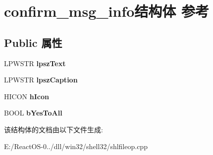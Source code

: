 \hypertarget{structconfirm__msg__info}{}\section{confirm\+\_\+msg\+\_\+info结构体 参考}
\label{structconfirm__msg__info}
\subsection*{Public 属性}
\begin{DoxyCompactItemize}
\item 
\mbox{\label{structconfirm__msg__info_a96a7677c3224ee97f63b7c2290651c9a}} 
L\+P\+W\+S\+TR {\bfseries lpsz\+Text}
\item 
\mbox{\label{structconfirm__msg__info_ab9f098ab8de4effed3ed2128dc3221ab}} 
L\+P\+W\+S\+TR {\bfseries lpsz\+Caption}
\item 
\mbox{\label{structconfirm__msg__info_a3d62a14e3b5f1a52b93ce4a45e17c3a9}} 
H\+I\+C\+ON {\bfseries h\+Icon}
\item 
\mbox{\label{structconfirm__msg__info_a467eff54630bf615ef6c0131baa04a0e}} 
B\+O\+OL {\bfseries b\+Yes\+To\+All}
\end{DoxyCompactItemize}


该结构体的文档由以下文件生成\+:\begin{DoxyCompactItemize}
\item 
E\+:/\+React\+O\+S-\/0../dll/win32/shell32/shlfileop.\+cpp\end{DoxyCompactItemize}
